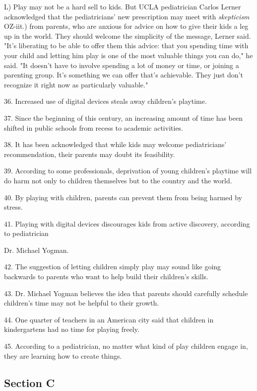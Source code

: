 \documentclass[UTF8,11pt]{ctexart}
\begin{document}
L) Play may not be a hard sell to kids. But UCLA pediatrician Carlos Lerner acknowledged that the pediatricians' new prescription may meet with \textit{skepticism }OZ-iit.) from parents, who are anxious for advice on how to give their kids a leg up in the world. They should welcome the simplicity of the message, Lerner said. "It's liberating to be able to offer them this advice: that you spending time with your child and letting him play is one of the most valuable things you can do," he said. "It doesn't have to involve spending a lot of money or time, or joining a parenting group. It's something we can offer that's achievable. They just don't recognize it right now as particularly valuable."


36. Increased use of digital devices steals away children's playtime.


37. Since the beginning of this century, an increasing amount of time has been shifted in public schools from recess to academic activities.


38. It has been acknowledged that while kids may welcome pediatricians' recommendation, their parents may doubt its feasibility.


39. According to some professionals, deprivation of young children's playtime will do harm not only to children themselves but to the country and the world.


40. By playing with children, parents can prevent them from being harmed by stress.


41. Playing with digital devices discourages kids from active discovery, according to pediatrician


Dr. Michael Yogman.


42. The suggestion of letting children simply play may sound like going backwards to parents who want to help build their children's skills.


43. Dr. Michael Yogman believes the idea that parents should carefully schedule children's time may not be helpful to their growth.


44. One quarter of teachers in an American city said that children in kindergartens had no time for playing freely.


45. According to a pediatrician, no matter what kind of play children engage in, they are learning how to create things.


\subsection*{\textbf{Section C}}
\end{document}
